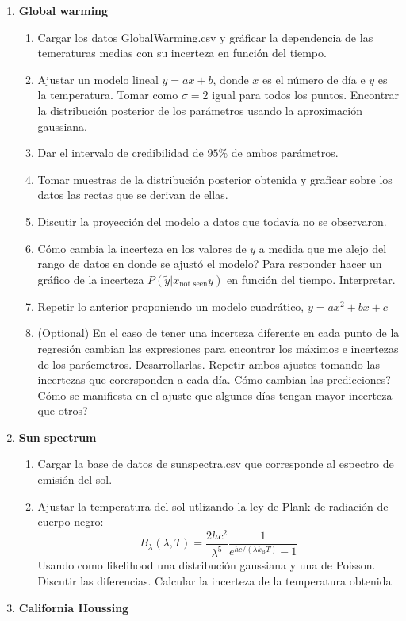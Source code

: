 \documentclass[12pt]{paper}
\begin{document}
\begin{enumerate}
\item \textbf{Global warming}
\begin{enumerate}
\item Cargar los datos GlobalWarming.csv y gráficar la dependencia de las temeraturas medias con su incerteza en función del tiempo.
\item Ajustar un modelo lineal $y = ax +b$, donde $x$ es el número de día e $y$ es la temperatura. Tomar como $\sigma =2$ igual para todos los puntos. Encontrar la distribución posterior de los parámetros usando la aproximación gaussiana.
\item Dar el intervalo de credibilidad de $95\%$ de ambos parámetros.
\item Tomar muestras de la distribución posterior obtenida y graficar sobre los datos las rectas que se derivan de ellas.
\item Discutir la proyección del modelo a datos que todavía no se observaron.
\item Cómo cambia la incerteza en los valores de $y$ a medida que me alejo del rango de datos en donde se ajustó el modelo? Para responder hacer un gráfico de la incerteza $P(\tilde{y}|x_{\text{not seen}}y)$ en función del tiempo. Interpretar.
\item Repetir lo anterior proponiendo un modelo cuadrático, $y = ax^{2} +bx +c$
\item (Optional) En el caso de tener una incerteza diferente en cada punto de la regresión cambian las expresiones para encontrar los máximos e incertezas de los paráemetros. Desarrollarlas. Repetir ambos ajustes tomando las incertezas que corersponden a cada día. Cómo cambian las predicciones? Cómo se manifiesta en el ajuste que algunos días tengan mayor incerteza que otros?
\end{enumerate}

\item \textbf{Sun spectrum}
\begin{enumerate}
\item Cargar la base de datos de sunspectra.csv que corresponde al espectro de emisión del sol.
\item Ajustar la temperatura del sol utlizando la ley de Plank de radiación de cuerpo negro:
\begin{equation}
{\displaystyle B_{\lambda }(\lambda ,T)={\frac {2hc^{2}}{\lambda ^{5}}}{\frac {1}{e^{hc/(\lambda k_{\mathrm {B} }T)}-1}}}
\end{equation}
Usando como likelihood una distribución gaussiana y una de Poisson. Discutir las diferencias. Calcular la incerteza de la temperatura obtenida
\end{enumerate}
\item \textbf{California Houssing}
\begin{enumerate}


\end{enumerate}
\end{enumerate}
\end{document}
